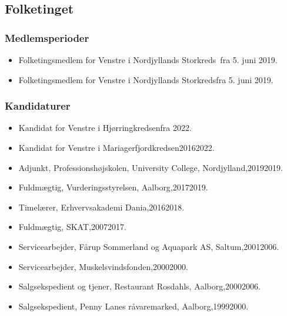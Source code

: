 \documentclass[11pt, a4paper]{awesome-cv}
\begin{document}
\begin{cvletter}
\subsection*{Folketinget}
\subsubsection*{Medlemsperioder}
\begin{itemize}
\item Folketingsmedlem for Venstre i Nordjyllands Storkreds fra 5. juni 2019.
\item Folketingsmedlem for Venstre i Nordjyllands Storkredsfra 5. juni 2019.
\end{itemize}
\subsubsection*{Kandidaturer}
\begin{itemize}
\item Kandidat for Venstre i Hjørringkredsenfra 2022.
\item Kandidat for Venstre i Mariagerfjordkredsen20162022.
\end{itemize}
\begin{itemize}
\item Adjunkt, Professionshøjskolen, University College, Nordjylland,20192019.
\item Fuldmægtig, Vurderingsstyrelsen, Aalborg,20172019.
\item Timelærer, Erhvervsakademi Dania,20162018.
\item Fuldmægtig, SKAT,20072017.
\item Servicearbejder, Fårup Sommerland og Aquapark AS, Saltum,20012006.
\item Servicearbejder, Muskelsvindsfonden,20002000.
\item Salgsekspedient og tjener, Restaurant Rosdahls, Aalborg,20002006.
\item Salgsekspedient, Penny Lanes råvaremarked, Aalborg,19992000.
\end{itemize}
\end{cvletter}
\end{document}
